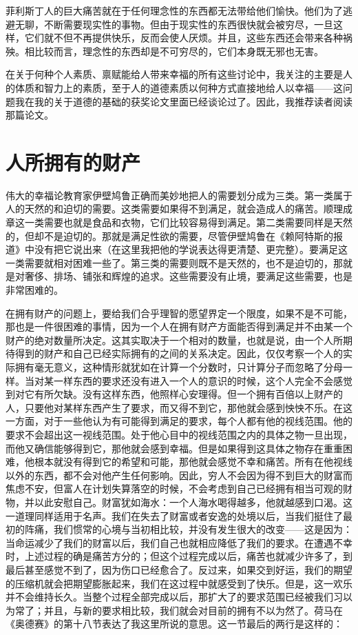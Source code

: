 \documentclass[12pt,oneside]{book}
\begin{document}
菲利斯丁人的巨大痛苦就在于任何理念性的东西都无法带给他们愉快。他们为了逃避无聊，不断需要现实性的事物。但由于现实性的东西很快就会被穷尽，一旦这样，它们就不但不再提供快乐，反而会使人厌烦。并且，这些东西还会带来各种祸殃。相比较而言，理念性的东西却是不可穷尽的，它们本身既无邪也无害。 


在关于何种个人素质、禀赋能给人带来幸福的所有这些讨论中，我关注的主要是人的体质和智力上的素质，至于人的道德素质以何种方式直接地给人以幸福——这问题我在我的关于道德的基础的获奖论文里面已经谈论过了。因此，我推荐读者阅读那篇论文。 


\chapter{人所拥有的财产} 
伟大的幸福论教育家伊壁鸠鲁正确而美妙地把人的需要划分成为三类。第一类属于人的天然的和迫切的需要。这类需要如果得不到满足，就会造成人的痛苦。顺理成章这一类需要也就是食品和衣物，它们比较容易得到满足。第二类需要同样是天然的，但却不是迫切的。那就是满足性欲的需要，尽管伊壁鸠鲁在《赖阿特斯的报道》中没有把它说出来（在这里我把他的学说表达得更清楚、更完整）。要满足这一类需要就相对困难一些了。第三类的需要则既不是天然的，也不是迫切的，那就是对奢侈、排场、铺张和辉煌的追求。这些需要没有止境，要满足这些需要，也是非常困难的。 

在拥有财产的问题上，要给我们合乎理智的愿望界定一个限度，如果不是不可能，那也是一件很困难的事情，因为一个人在拥有财产方面能否得到满足并不由某一个财产的绝对数量所决定。这其实取决于一个相对的数量，也就是说，由一个人所期待得到的财产和自己已经实际拥有的之间的关系决定。因此，仅仅考察一个人的实际拥有毫无意义，这种情形就犹如在计算一个分数时，只计算分子而忽略了分母一样。当对某一样东西的要求还没有进入一个人的意识的时候，这个人完全不会感觉到对它有所欠缺。没有这样东西，他照样心安理得。但一个拥有百倍以上财产的人，只要他对某样东西产生了要求，而又得不到它，那他就会感到怏怏不乐。在这一方面，对于一些他认为有可能得到满足的要求，每个人都有他的视线范围。他的要求不会超出这一视线范围。处于他心目中的视线范围之内的具体之物一旦出现，而他又确信能够得到它，那他就会感到幸福。但是如果得到这具体之物存在重重困难，他根本就没有得到它的希望和可能，那他就会感觉不幸和痛苦。所有在他视线以外的东西，都不会对他产生任何影响。因此，穷人不会因为得不到巨大的财富而焦虑不安，但富人在计划失算落空的时候，不会考虑到自己已经拥有相当可观的财物，并以此安慰自己。财富犹如海水：一个人海水喝得越多，他就越感到口渴。这一道理同样适用于名声。我们在失去了财富或者安逸的处境以后，当我们挺住了最初的阵痛，我们惯常的心境与当初相比较，并没有发生很大的改变——这是因为：当命运减少了我们的财富以后，我们自己也就相应降低了我们的要求。在遭遇不幸时，上述过程的确是痛苦方分的；但这个过程完成以后，痛苦也就减少许多了，到最后甚至感觉不到了，因为伤口已经愈合了。反过来，如果交到好运，我们的期望的压缩机就会把期望膨胀起来，我们在这过程中就感受到了快乐。但是，这一欢乐并不会维持长久。当整个过程全部完成以后，那扩大了的要求范围已经被我们习以为常了；并且，与新的要求相比较，我们就会对目前的拥有不以为然了。荷马在《奥德赛》的第十八节表达了我这里所说的意思。这一节最后的两行是这样的： 
\end{document}
